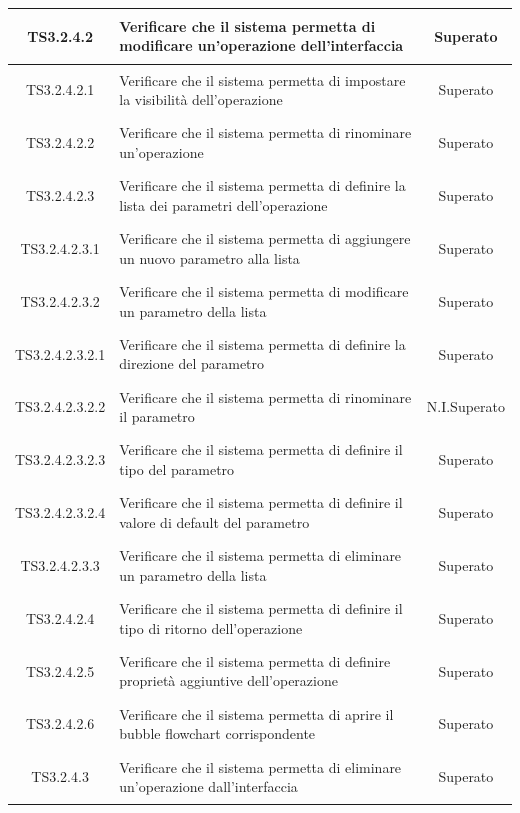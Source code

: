 \documentclass[../PianoDiQualifica.tex]{subfiles}
\begin{document}
\begin{longtable}{|c|>{\centering}p{10cm}|c|}
	\hline
	\hypertarget{TS3.2.4.2}{TS3.2.4.2} & Verificare che il sistema permetta di modificare un'operazione dell'interfaccia & Superato\\
	\hline
	\hypertarget{TS3.2.4.2.1}{TS3.2.4.2.1} & Verificare che il sistema permetta di impostare la visibilità dell'operazione & Superato \\
	\hline
	\hypertarget{TS3.2.4.2.2}{TS3.2.4.2.2} & Verificare che il sistema permetta di rinominare un'operazione & Superato \\
	\hline
	\hypertarget{TS3.2.4.2.3}{TS3.2.4.2.3} & Verificare che il sistema permetta di definire la lista dei parametri dell'operazione & Superato \\
	\hline
	\hypertarget{TS3.2.4.2.3.1}{TS3.2.4.2.3.1} & Verificare che il sistema permetta di aggiungere un nuovo parametro alla lista & Superato\\
	\hline
	\hypertarget{TS3.2.4.2.3.2}{TS3.2.4.2.3.2} & Verificare che il sistema permetta di modificare un parametro della lista & Superato\\
	\hline
	\hypertarget{TS3.2.4.2.3.2.1}{TS3.2.4.2.3.2.1} & Verificare che il sistema permetta di definire la direzione del parametro & Superato\\
	\hline
	\hypertarget{TS3.2.4.2.3.2.2}{TS3.2.4.2.3.2.2} & Verificare che il sistema permetta di rinominare il parametro & N.I.Superato \\
	\hline
	\hypertarget{TS3.2.4.2.3.2.3}{TS3.2.4.2.3.2.3} & Verificare che il sistema permetta di definire il tipo del parametro & Superato\\
	\hline
	\hypertarget{TS3.2.4.2.3.2.4}{TS3.2.4.2.3.2.4} & Verificare che il sistema permetta di definire il valore di default del parametro & Superato \\
	\hline
	\hypertarget{TS3.2.4.2.3.3}{TS3.2.4.2.3.3} & Verificare che il sistema permetta di eliminare un parametro della lista & Superato \\
	\hline
	\hypertarget{TS3.2.4.2.4}{TS3.2.4.2.4} & Verificare che il sistema permetta di definire il tipo di ritorno dell'operazione & Superato \\
	\hline
	\hypertarget{TS3.2.4.2.5}{TS3.2.4.2.5} & Verificare che il sistema permetta di definire proprietà aggiuntive dell'operazione & Superato \\
	\hline
	\hypertarget{TS3.2.4.2.6}{TS3.2.4.2.6} & Verificare che il sistema permetta di aprire il bubble flowchart corrispondente & Superato \\
	\hline
	\hypertarget{TS3.2.4.3}{TS3.2.4.3} & Verificare che il sistema permetta di eliminare un'operazione dall'interfaccia & Superato \\

\end{longtable}
\end{document}
